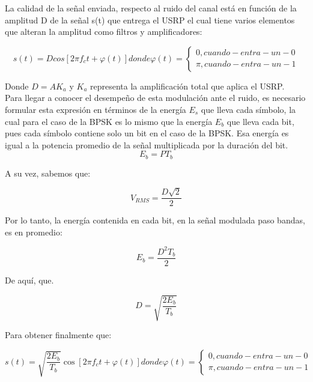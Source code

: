 La calidad de la señal enviada, respecto al ruido del canal está en función de la amplitud D de la señal s(t) que entrega el USRP el cual tiene varios elementos que alteran la amplitud como filtros y amplificadores:

 \begin{equation} \label{capcuatro_seis}
	  s(t)=D cos[2\pi f_{c}t+\varphi(t)] donde \varphi(t) = \begin{cases} 0, cuando- entra- un -0\\ \pi, cuando- entra- un -1 
	\end{cases}
\end{equation}

Donde $D=AK_a$ y $K_a$ representa la amplificación total que aplica el USRP. \\

Para llegar a conocer el desempeño de esta modulación ante el ruido, es necesario formular esta expresión en términos de la energía $E_s$ que lleva cada símbolo, la cual para el caso de la BPSK es lo mismo que la energía $E_b$ que lleva cada bit, pues cada símbolo contiene solo un bit en el caso de la BPSK. Esa energía es igual a la potencia promedio de la señal multiplicada por la duración del bit.\\

 \begin{equation} \label{capcuatro_siete}
	 E_b=PT_{b}
\end{equation}

A su vez, sabemos que:

 \begin{equation} \label{capcuatro_ocho}
	 V_{RMS}=\frac{D\sqrt{2}}{2}
\end{equation}

Por lo tanto, la energía contenida en cada bit, en la señal modulada paso bandas, es en promedio:

 \begin{equation} \label{capcuatro_nueve}
	 E_{b}=\frac{D^{2}T_b}{2}
\end{equation}

De aquí, que.

\begin{equation} \label{capcuatro_diez}
	 D=\sqrt{\dfrac{2E_b}{T_b}}
\end{equation}

Para obtener finalmente que:

\begin{equation} \label{capcuatro_once}
	 s(t)= \sqrt{\dfrac{2E_{b}}{T_{b}}} \cos [2\pi f_{c}t+\varphi(t)] donde \varphi(t)= \begin{cases} 0, cuando- entra- un -0\\ \pi, cuando- entra- un -1 
	\end{cases}
\end{equation}

